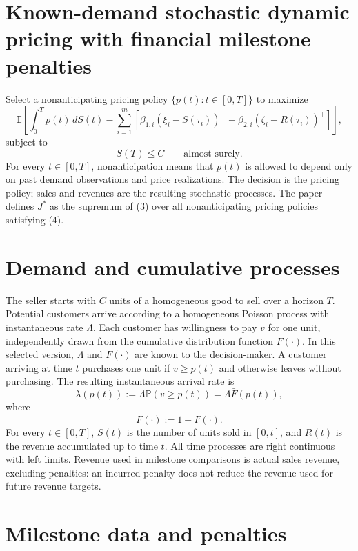 \documentclass{article}
\begin{document}
\section*{Known-demand stochastic dynamic pricing with financial milestone penalties}

Select a nonanticipating pricing policy $\{p(t):t\in[0,T]\}$ to maximize
\begin{equation}
\mathbb{E}\left[
\int_0^T p(t)\,dS(t)
-\sum_{i=1}^{m}\left[
\beta_{1,i}(\xi_i-S(\tau_i))^{+}
+\beta_{2,i}(\zeta_i-R(\tau_i))^{+}
\right]\right],
\tag{3}
\end{equation}
subject to
\begin{equation}
S(T)\le C\qquad\text{almost surely}.
\tag{4}
\end{equation}
For every $t\in[0,T]$, nonanticipation means that $p(t)$ is allowed to depend only on past demand observations and price realizations. The decision is the pricing policy; sales and revenues are the resulting stochastic processes. The paper defines $J^*$ as the supremum of (3) over all nonanticipating pricing policies satisfying (4).

\section*{Demand and cumulative processes}

The seller starts with $C$ units of a homogeneous good to sell over a horizon $T$. Potential customers arrive according to a homogeneous Poisson process with instantaneous rate $\Lambda$. Each customer has willingness to pay $v$ for one unit, independently drawn from the cumulative distribution function $F(\cdot)$. In this selected version, $\Lambda$ and $F(\cdot)$ are known to the decision-maker. A customer arriving at time $t$ purchases one unit if $v\ge p(t)$ and otherwise leaves without purchasing. The resulting instantaneous arrival rate is
\begin{equation}
\lambda(p(t)):=\Lambda\mathbb{P}(v\ge p(t))
=\Lambda\bar F(p(t)),
\tag{1}
\end{equation}
where
\[
\bar F(\cdot):=1-F(\cdot).
\]
For every $t\in[0,T]$, $S(t)$ is the number of units sold in $[0,t]$, and $R(t)$ is the revenue accumulated up to time $t$. All time processes are right continuous with left limits. Revenue used in milestone comparisons is actual sales revenue, excluding penalties: an incurred penalty does not reduce the revenue used for future revenue targets.

\section*{Milestone data and penalties}
\end{document}
